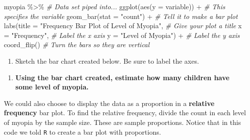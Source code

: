\documentclass[
]{report}
\newenvironment{Shaded}{\begin{snugshade}}{\end{snugshade}}
\newcommand{\AttributeTok}[1]{\textcolor[rgb]{0.77,0.63,0.00}{#1}}
\newcommand{\CommentTok}[1]{\textcolor[rgb]{0.56,0.35,0.01}{\textit{#1}}}
\newcommand{\FunctionTok}[1]{\textcolor[rgb]{0.00,0.00,0.00}{#1}}
\newcommand{\NormalTok}[1]{#1}
\newcommand{\SpecialCharTok}[1]{\textcolor[rgb]{0.00,0.00,0.00}{#1}}
\newcommand{\StringTok}[1]{\textcolor[rgb]{0.31,0.60,0.02}{#1}}
\providecommand{\tightlist}{%
  \setlength{\itemsep}{0pt}\setlength{\parskip}{0pt}}
\begin{document}
\begin{Shaded}
\begin{Highlighting}[]
\NormalTok{myopia }\SpecialCharTok{\%\textgreater{}\%} \CommentTok{\# Data set piped into...}
\FunctionTok{ggplot}\NormalTok{(}\FunctionTok{aes}\NormalTok{(}\AttributeTok{y =}\NormalTok{ variable)) }\SpecialCharTok{+}   \CommentTok{\# This specifies the variable}
  \FunctionTok{geom\_bar}\NormalTok{(}\AttributeTok{stat =} \StringTok{"count"}\NormalTok{) }\SpecialCharTok{+}  \CommentTok{\# Tell it to make a bar plot}
  \FunctionTok{labs}\NormalTok{(}\AttributeTok{title =} \StringTok{"Frequency Bar Plot of Level of Myopia"}\NormalTok{,  }\CommentTok{\# Give your plot a title}
       \AttributeTok{x =} \StringTok{"Frequency"}\NormalTok{,   }\CommentTok{\# Label the x axis}
       \AttributeTok{y =} \StringTok{"Level of Myopia"}\NormalTok{)  }\SpecialCharTok{+} \CommentTok{\# Label the y axis}
  \FunctionTok{coord\_flip}\NormalTok{()  }\CommentTok{\# Turn the bars so they are vertical}
\end{Highlighting}
\end{Shaded}

\begin{enumerate}
\def\labelenumi{\arabic{enumi}.}
\setcounter{enumi}{1}
\tightlist
\item
  Sketch the bar chart created below. Be sure to label the axes.
\end{enumerate}

\vspace{2in}

\begin{enumerate}
\def\labelenumi{\arabic{enumi}.}
\setcounter{enumi}{2}
\tightlist
\item
  \textbf{Using the bar chart created, estimate how many children have some level of myopia.}
\end{enumerate}

\newpage

We could also choose to display the data as a proportion in a \textbf{relative frequency} bar plot. To find the relative frequency, divide the count in each level of myopia by the sample size. These are sample proportions. Notice that in this code we told \texttt{R} to create a bar plot with proportions.
\end{document}

